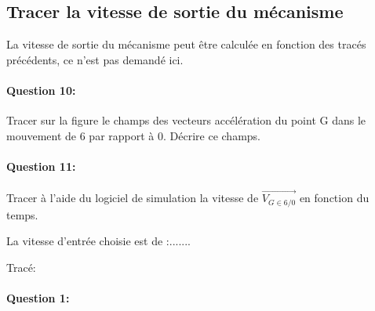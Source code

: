 \subsection{Tracer la vitesse de sortie du mécanisme}

La vitesse de sortie du mécanisme peut être calculée en fonction des tracés précédents, ce n'est pas demandé ici.

\paragraph{Question 10:} Tracer sur la figure le champs des vecteurs accélération du point G dans le mouvement de 6 par rapport à 0. Décrire ce champs.

\paragraph{Question 11:} Tracer à l'aide du logiciel de simulation la vitesse de $\overrightarrow{V_{G\in 6/0}}$ en fonction du temps.

\newpage

La vitesse d'entrée choisie est de :.......

Tracé:
\vspace{10cm}




\pagestyle{correction}\setcounter{section}{0}

\paragraph{Question 1:}
